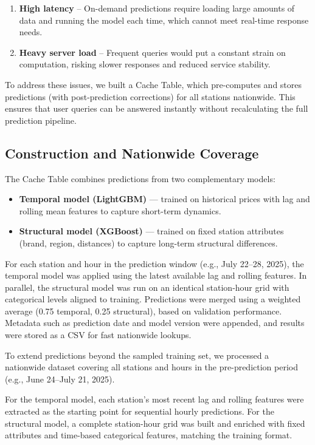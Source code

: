 \begin{enumerate}
    \item \textbf{High latency} -- On-demand predictions require loading large amounts of data and running the model each time, which cannot meet real-time response needs.
    \item \textbf{Heavy server load} -- Frequent queries would put a constant strain on computation, risking slower responses and reduced service stability.
\end{enumerate}

To address these issues, we built a Cache Table, which pre-computes and stores predictions (with post-prediction corrections) for all stations nationwide. This ensures that user queries can be answered instantly without recalculating the full prediction pipeline.

\subsection{Construction and Nationwide Coverage}

The Cache Table combines predictions from two complementary models:
\begin{itemize}
    \item \textbf{Temporal model (LightGBM)} --- trained on historical prices with lag and rolling mean features to capture short-term dynamics.
    \item \textbf{Structural model (XGBoost)} --- trained on fixed station attributes (brand, region, distances) to capture long-term structural differences.
\end{itemize}

For each station and hour in the prediction window (e.g., July 22--28, 2025), the temporal model was applied using the latest available lag and rolling features. In parallel, the structural model was run on an identical station-hour grid with categorical levels aligned to training. Predictions were merged using a weighted average (0.75 temporal, 0.25 structural), based on validation performance. Metadata such as prediction date and model version were appended, and results were stored as a CSV for fast nationwide lookups.

To extend predictions beyond the sampled training set, we processed a nationwide dataset covering all stations and hours in the pre-prediction period (e.g., June 24--July 21, 2025).

For the temporal model, each station's most recent lag and rolling features were extracted as the starting point for sequential hourly predictions. For the structural model, a complete station-hour grid was built and enriched with fixed attributes and time-based categorical features, matching the training format.

